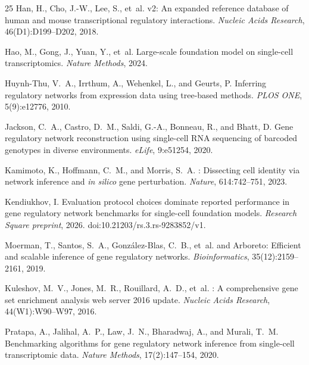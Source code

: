 \documentclass[11pt,a4paper]{article}
\begin{document}
\begin{thebibliography}{25}
Han, H., Cho, J.-W., Lee, S., et~al.
 v2: An expanded reference database of human and mouse transcriptional regulatory interactions.
\newblock \emph{Nucleic Acids Research}, 46(D1):D199--D202, 2018.

Hao, M., Gong, J., Yuan, Y., et~al.
\newblock Large-scale foundation model on single-cell transcriptomics.
\newblock \emph{Nature Methods}, 2024.

Huynh-Thu, V.~A., Irrthum, A., Wehenkel, L., and Geurts, P.
\newblock Inferring regulatory networks from expression data using tree-based methods.
\newblock \emph{PLOS ONE}, 5(9):e12776, 2010.

Jackson, C.~A., Castro, D.~M., Saldi, G.-A., Bonneau, R., and Bhatt, D.
\newblock Gene regulatory network reconstruction using single-cell {RNA} sequencing of barcoded genotypes in diverse environments.
\newblock \emph{eLife}, 9:e51254, 2020.

Kamimoto, K., Hoffmann, C.~M., and Morris, S.~A.
: Dissecting cell identity via network inference and \emph{in silico} gene perturbation.
\newblock \emph{Nature}, 614:742--751, 2023.

Kendiukhov, I.
\newblock Evaluation protocol choices dominate reported performance in gene regulatory network benchmarks for single-cell foundation models.
\newblock \emph{Research Square preprint}, 2026.
\newblock doi:10.21203/rs.3.rs-9283852/v1.

Moerman, T., Santos, S.~A., Gonz{\'a}lez-Blas, C.~B., et~al.
 and {Arboreto}: Efficient and scalable inference of gene regulatory networks.
\newblock \emph{Bioinformatics}, 35(12):2159--2161, 2019.

Kuleshov, M.~V., Jones, M.~R., Rouillard, A.~D., et~al.
: A comprehensive gene set enrichment analysis web server 2016 update.
\newblock \emph{Nucleic Acids Research}, 44(W1):W90--W97, 2016.

Pratapa, A., Jalihal, A.~P., Law, J.~N., Bharadwaj, A., and Murali, T.~M.
\newblock Benchmarking algorithms for gene regulatory network inference from single-cell transcriptomic data.
\newblock \emph{Nature Methods}, 17(2):147--154, 2020.


\end{thebibliography}
\end{document}
